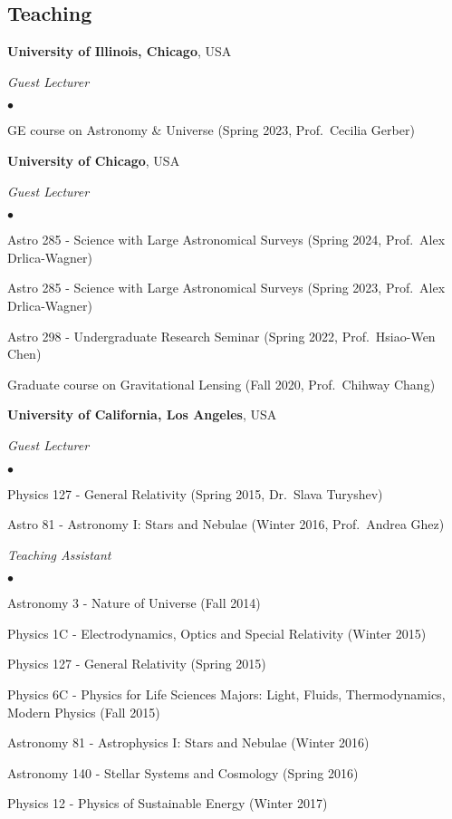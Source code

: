 \documentclass[margin, line]{res}
\newenvironment{list2}{
  \begin{list}{$\bullet$}{%
      \setlength{\itemsep}{0in}
      \setlength{\parsep}{0in} \setlength{\parskip}{0in}
      \setlength{\topsep}{0in} \setlength{\partopsep}{0in} 
      \setlength{\leftmargin}{0.2in}}}{\end{list}}
\begin{document}
\begin{resume}
\section{\sc Teaching}

{\bf University of Illinois, Chicago}, USA

{\em Guest Lecturer} \hfill {\bf}\\
\begin{list2}
	\item GE course on Astronomy \& Universe (Spring 2023, Prof.~Cecilia Gerber)
\end{list2}

{\bf University of Chicago}, USA

{\em Guest Lecturer} \hfill {\bf}\\
\begin{list2}
	\item Astro 285 - Science with Large Astronomical Surveys (Spring 2024, Prof.~Alex Drlica-Wagner)
	\item Astro 285 - Science with Large Astronomical Surveys (Spring 2023, Prof.~Alex Drlica-Wagner)
	\item Astro 298 - Undergraduate Research Seminar (Spring 2022, Prof.~Hsiao-Wen Chen)
 	\item Graduate course on Gravitational Lensing (Fall 2020, Prof.~Chihway Chang)
\end{list2}
	
	
{\bf University of California, Los Angeles}, USA



{\em Guest Lecturer} \hfill {\bf}\\
\begin{list2}
	\item Physics 127 - General Relativity (Spring 2015, Dr.~Slava Turyshev)
	\item Astro 81 - Astronomy I: Stars and Nebulae (Winter 2016, Prof.~Andrea Ghez)
\end{list2}
	
{\em Teaching Assistant} \hfill {}\\
\begin{list2}
	\item Astronomy 3 - Nature of Universe (Fall 2014)
	\item Physics 1C - Electrodynamics, Optics and Special Relativity (Winter 2015)
	\item Physics 127 - General Relativity (Spring 2015)
	\item Physics 6C - Physics for Life Sciences Majors: Light, Fluids, Thermodynamics, Modern Physics (Fall 2015)
	\item Astronomy 81 - Astrophysics I: Stars and Nebulae (Winter 2016)
	\item Astronomy 140 - Stellar Systems and Cosmology (Spring 2016)
	\item Physics 12 - Physics of Sustainable Energy (Winter 2017)
\end{list2}


\end{resume}
\end{document}
